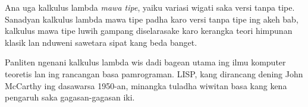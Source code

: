 \documentclass[../../../include/open-logic-section]{subfiles}
\begin{document}
\begin{digress}
Ana uga kalkulus lambda \emph{mawa tipe},
yaiku variasi wigati saka versi tanpa tipe.
Sanadyan kalkulus lambda mawa tipe padha
karo versi tanpa tipe ing akeh bab, kalkulus
mawa tipe luwih gampang diselarasake karo
kerangka teori himpunan klasik lan nduweni
sawetara sipat kang beda banget.

Panliten ngenani kalkulus lambda wis dadi
bagean utama ing ilmu komputer teoretis
lan ing rancangan basa pamrograman. LISP,
kang dirancang dening John McCarthy ing
dasawarsa 1950-an, minangka tuladha wiwitan
basa kang kena pengaruh saka gagasan-gagasan iki.
\end{digress}
\end{document}

